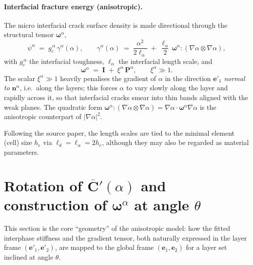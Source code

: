 \documentclass[12pt,a4paper]{article}
\newcommand{\bI}{\mathbf{I}}
\newcommand{\bn}{\mathbf{n}}
\newcommand{\bP}{\mathbf{P}}
\newcommand{\bomega}{\boldsymbol{\omega}}
\newcommand{\Cp}{\overline{\mathbf{C}}'}             %
\begin{document}
	\paragraph{Interfacial fracture energy (anisotropic).}
	The micro interfacial crack surface density is made directional through the
	structural tensor $\bomega^{\alpha}$,
	\begin{equation}\label{eq:gammaa}
		\psi^{\alpha} \;=\; g_c^{\,\alpha}\,\gamma^{\alpha}(\alpha),
		\qquad
		\gamma^{\alpha}(\alpha) \;=\; \frac{\alpha^2}{2\ell_\alpha}
		\;+\; \frac{\ell_\alpha}{2}\,\bomega^{\alpha}\!:(\nabla\alpha\otimes\nabla\alpha),
	\end{equation}
	with $g_c^{\,\alpha}$ the interfacial toughness, $\ell_\alpha$ the interfacial
	length scale, and
	\begin{equation}\label{eq:omegaa}
		\bomega^{\alpha} \;=\; \bI \;+\; \xi^{\alpha}\,\bP^{\alpha},
		\qquad \xi^{\alpha}\gg 1 .
	\end{equation}
	The scalar $\xi^{\alpha}\gg1$ heavily penalises the gradient of $\alpha$ in the
	direction $\mathbf{e}'_1$ \emph{normal to} $\bn^{\alpha}$, i.e.\ along the
	layers; this forces $\alpha$ to vary slowly along the layer and rapidly across
	it, so that interfacial cracks smear into thin bands aligned with the weak
	planes. The quadratic form $\bomega^{\alpha}\!:(\nabla\alpha\otimes\nabla\alpha)=
	\nabla\alpha\cdot\bomega^{\alpha}\nabla\alpha$ is the anisotropic counterpart of
	$|\nabla\alpha|^2$.

	Following the source paper, the length scales are tied to the minimal element
	(cell) size $h_e$ via $\ell_d=\ell_\alpha=2h_e$, although they may also be
	regarded as material parameters.

	\section{\texorpdfstring{Rotation of $\Cp(\alpha)$ and construction of $\bomega^{\alpha}$ at angle $\theta$}{Rotation of C'(alpha) and construction of omega-alpha at angle theta}}\label{sec:rotation}

	This section is the core ``geometry'' of the anisotropic model: how the fitted
	interphase stiffness and the gradient tensor, both naturally expressed in the
	layer frame $(\mathbf{e}'_1,\mathbf{e}'_2)$, are mapped to the global frame
	$(\mathbf{e}_1,\mathbf{e}_2)$ for a layer set inclined at angle $\theta$.
\end{document}
